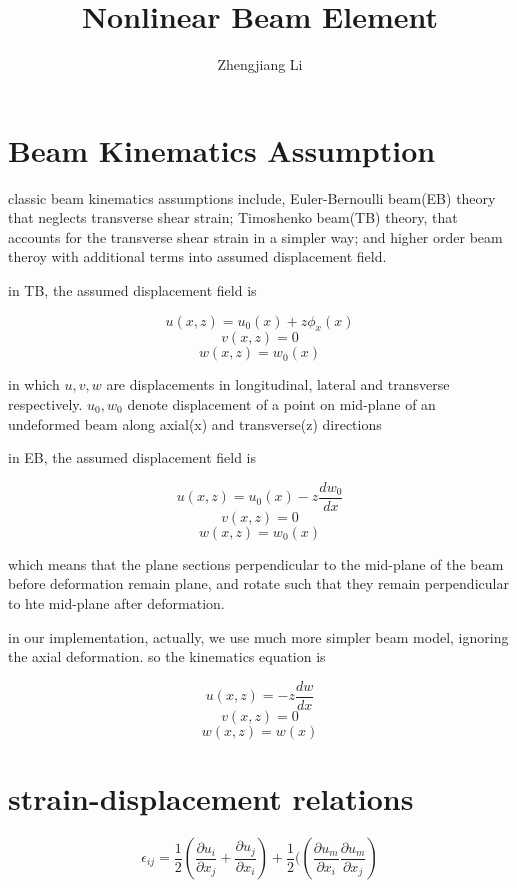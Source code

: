 \documentclass[11pt]{article}
\begin{document}
\title{Nonlinear Beam Element}

\author{Zhengjiang Li}

\date{}

\maketitle

\section{Beam Kinematics Assumption}

classic beam kinematics assumptions include, Euler-Bernoulli beam(EB) theory that neglects transverse shear strain; Timoshenko beam(TB) theory, that accounts for the transverse shear strain in a simpler way; and higher order beam theroy with additional terms into assumed displacement field.

in TB, the assumed displacement field is

$$ u(x,z) = u_0(x) + z \phi_x(x) $$
$$ v(x,z) = 0 $$
$$ w(x,z) = w_0(x) $$ 

in which $u, v, w$ are displacements in longitudinal, lateral and transverse respectively. $u_0, w_0$ denote displacement of a point on mid-plane of an undeformed beam along axial(x) and transverse(z) directions


in EB, the assumed displacement field is

$$ u(x,z) = u_0(x) - z \frac{dw_0}{dx} $$
$$ v(x,z) = 0 $$
$$ w(x,z) = w_0(x) $$

which means that the plane sections perpendicular to the mid-plane of the beam before deformation remain plane, and rotate such that they remain perpendicular to hte mid-plane after deformation.

in our implementation, actually, we use much more simpler beam model, ignoring the axial deformation. so the kinematics equation is

$$ u(x,z) = -z \frac{dw} {dx} $$
$$ v(x,z) = 0 $$
$$ w(x,z) = w(x) $$


\section{strain-displacement relations}

$$ \epsilon_{ij} = \frac{1}{2} ( \frac{\partial u_i}{\partial x_j} + \frac{\partial u_j}{\partial x_i}) + \frac{1}{2} ((\frac{\partial u_m}{\partial x_i} \frac{\partial u_m}{\partial x_j}) $$
\end{document}
